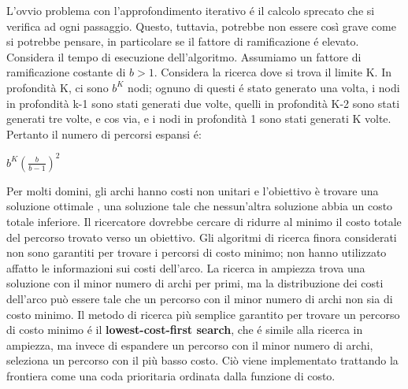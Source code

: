 \documentclass[a4paper]{extarticle}
\begin{document}
L'ovvio problema con l'approfondimento iterativo é il calcolo sprecato che si verifica ad ogni passaggio. Questo, tuttavia, potrebbe non essere così grave come si potrebbe pensare, in particolare se il fattore di ramificazione é elevato. Considera il tempo di esecuzione dell'algoritmo. Assumiamo un fattore di ramificazione costante di $b>1$. Considera la ricerca dove si trova il limite K. In profondità K, ci sono $b^K$ nodi; ognuno di questi é stato generato una volta, i nodi in profondità k-1 sono stati generati due volte, quelli in profondità K-2 sono stati generati tre volte, e cos via, e i nodi in profondità 1 sono stati generati K volte. Pertanto il numero di percorsi espansi é:
\begin{center}
$b^K\left(\frac{b}{b-1}\right)^2$
\end{center}

Per molti domini, gli archi hanno costi non unitari e l'obiettivo è trovare una soluzione ottimale , una soluzione tale che nessun'altra soluzione abbia un costo totale inferiore. Il ricercatore dovrebbe cercare di ridurre al minimo il costo totale del percorso trovato verso un obiettivo. Gli algoritmi di ricerca finora considerati non sono garantiti per trovare i percorsi di costo minimo; non hanno utilizzato affatto le informazioni sui costi dell'arco. La ricerca in ampiezza trova una soluzione con il minor numero di archi per primi, ma la distribuzione dei costi dell'arco può essere tale che un percorso con il minor numero di archi non sia di costo minimo. Il metodo di ricerca più semplice garantito per trovare un percorso di costo minimo é il \textbf{lowest-cost-first search}, che é simile alla ricerca in ampiezza, ma invece di espandere un percorso con il minor numero di archi, seleziona un percorso con il più basso costo. Ciò viene implementato trattando la frontiera come una coda prioritaria ordinata dalla funzione di costo. 
\end{document}
